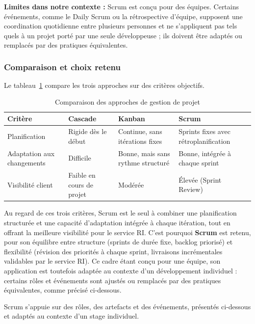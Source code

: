 \textbf{Limites dans notre contexte :} Scrum est conçu pour des équipes. Certains
événements, comme le Daily Scrum ou la rétrospective d'équipe, supposent une
coordination quotidienne entre plusieurs personnes et ne s'appliquent pas tels
quels à un projet porté par une seule développeuse ; ils doivent être adaptés
ou remplacés par des pratiques équivalentes.

\subsubsection{Comparaison et choix retenu}

Le tableau~\ref{tab:methodo_comparaison} compare les trois approches sur des critères objectifs.

\renewcommand{\arraystretch}{1.4}
\begin{table}[H]
\centering
\caption{Comparaison des approches de gestion de projet}
\label{tab:methodo_comparaison}
\footnotesize
\begin{tabular}{|p{3cm}|p{3cm}|p{3cm}|p{3cm}|}
\hline
\rowcolor{gray!20}
\textbf{Critère} & \textbf{Cascade} & \textbf{Kanban} & \textbf{Scrum} \\
\hline
Planification & Rigide dès le début & Continue, sans itérations fixes & Sprints fixes avec rétroplanification \\
\hline
Adaptation aux changements & Difficile & Bonne, mais sans rythme structuré & Bonne, intégrée à chaque sprint \\
\hline
Visibilité client & Faible en cours de projet & Modérée & Élevée (Sprint Review) \\
\hline
\end{tabular}
\end{table}

Au regard de ces trois critères, Scrum est le seul à combiner une planification structurée et une capacité d'adaptation intégrée à chaque itération, tout en offrant la meilleure visibilité pour le service RI. C'est pourquoi \textbf{Scrum} est retenu, pour son équilibre entre structure (sprints de durée
fixe, backlog priorisé) et flexibilité (révision des priorités à chaque sprint,
livraisons incrémentales validables par le service RI). Ce cadre étant conçu
pour une équipe, son application est toutefois adaptée au contexte d'un
développement individuel : certains rôles et événements sont ajustés ou
remplacés par des pratiques équivalentes, comme précisé ci-dessous.

Scrum s'appuie sur des rôles, des artefacts et des événements, présentés
ci-dessous et adaptés au contexte d'un stage individuel.


